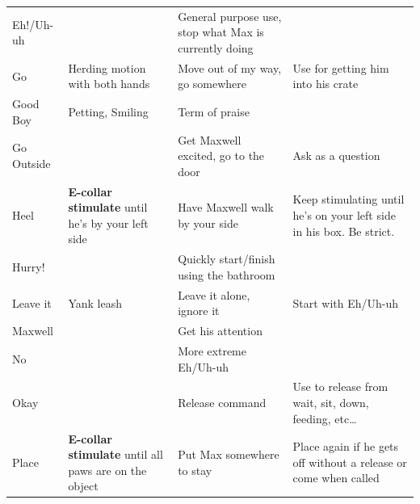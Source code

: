 \documentclass[pdftex,12pt]{article}
\begin{document}
\begin{table}[H]
\begin{adjustwidth}{-4.5cm}{-4.5cm}
\begin{center}
\begin{tabular}{lp{}p{}p{}}
\rowcolor{gray!25} Eh!/Uh-uh  &                                                                  & General purpose use, stop what Max is currently doing &                                                                      \\
\rowcolor{white}   Go         & Herding motion with both hands                                   & Move out of my way, go somewhere                      & Use for getting him into his crate                                   \\
\rowcolor{gray!25} Good Boy   & Petting, Smiling                                                 & Term of praise                                        &                                                                      \\
\rowcolor{white}   Go Outside &                                                                  & Get Maxwell excited, go to the door                   & Ask as a question                                                    \\
\rowcolor{gray!25} Heel       & \textbf{E-collar stimulate} until he's by your left side                  & Have Maxwell walk by your side                        & Keep stimulating until he's on your left side in his box. Be strict. \\
\rowcolor{white}   Hurry!     &                                                                  & Quickly start/finish using the bathroom & \\
\rowcolor{gray!25}   Leave it   & Yank leash                                                       & Leave it alone, ignore it                             & Start with Eh/Uh-uh                                                  \\
\rowcolor{white} Maxwell    &                                                                  & Get his attention                                     &                                                                      \\
\rowcolor{gray!25}   No         &                                                                  & More extreme Eh/Uh-uh                                 &                                                                      \\
\rowcolor{white} Okay       &                                                                  & Release command                                       & Use to release from wait, sit, down, feeding, etc\ldots              \\
\rowcolor{gray!25}   Place      & \textbf{E-collar stimulate} until all paws are on the object              & Put Max somewhere to stay                             & Place again if he gets off without a release or come when called     \\
\end{tabular}
\egroup%
\end{center}
\end{adjustwidth}
\end{table}
\end{document}
